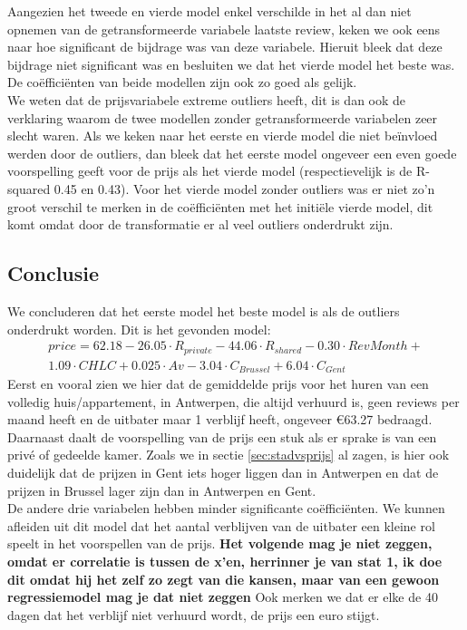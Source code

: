 \documentclass[a4paper,kulak]{kulakarticle} %
\begin{document}
Aangezien het tweede en vierde model enkel verschilde in het al dan niet opnemen van de getransformeerde variabele laatste review, keken we ook eens naar hoe significant de bijdrage was van deze variabele. Hieruit bleek dat deze bijdrage niet significant was en besluiten we dat het vierde model het beste was. De co\"effici\"enten van beide modellen zijn ook zo goed als gelijk.\\

We weten dat de prijsvariabele extreme outliers heeft, dit is dan ook de verklaring waarom de twee modellen zonder getransformeerde variabelen zeer slecht waren. Als we keken naar het eerste en vierde model die niet be\"invloed werden door de outliers, dan bleek dat het eerste model ongeveer een even goede voorspelling geeft voor de prijs als het vierde model (respectievelijk is de R-squared 0.45 en 0.43). Voor het vierde model zonder outliers was er niet zo'n groot verschil te merken in de co\"effici\"enten met het initi\"ele vierde model, dit komt omdat door de transformatie er al veel outliers onderdrukt zijn.\\
\subsection{Conclusie}
We concluderen dat het eerste model het beste model is als de outliers onderdrukt worden. Dit is het gevonden model:
\begin{multline}
price = 62.18 - 26.05\cdot R_{private}  - 44.06\cdot R_{shared}  - 0.30\cdot RevMonth + \\1.09\cdot CHLC + 0.025 \cdot Av - 3.04\cdot C_{Brussel} + 6.04\cdot C_{Gent}
\end{multline}
Eerst en vooral zien we hier dat de gemiddelde prijs voor het huren van een volledig huis/appartement, in Antwerpen, die altijd verhuurd is, geen reviews per maand heeft en de uitbater maar 1 verblijf heeft, ongeveer \euro  63.27 bedraagd. Daarnaast daalt de voorspelling van de prijs een stuk als er sprake is van een priv\'e of gedeelde kamer. Zoals we in sectie \ref{sec:stadvsprijs} al zagen, is hier ook duidelijk dat de prijzen in Gent iets hoger liggen dan in Antwerpen en dat de prijzen in Brussel lager zijn dan in Antwerpen en Gent.\\

De andere drie variabelen hebben minder significante co\"effici\"enten. We kunnen afleiden uit dit model dat het aantal verblijven van de uitbater een kleine rol speelt in het voorspellen van de prijs. 
\textbf{Het volgende mag je niet zeggen, omdat er correlatie is tussen de x'en, herrinner je van stat 1, ik doe dit omdat hij het zelf zo zegt van die kansen, maar van een gewoon regressiemodel mag je dat niet zeggen}
Ook merken we dat er elke de 40 dagen dat het verblijf niet verhuurd wordt, de prijs een euro stijgt. 
\end{document}
